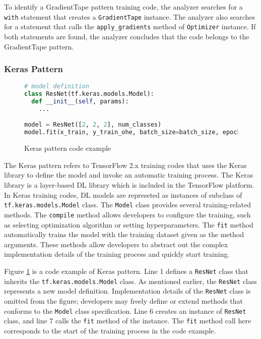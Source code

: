 To identify a GradientTape pattern training code,
the analyzer searches for a {\tt with} statement that creates a
{\tt GradientTape} instance.
The analyzer also searches for a statement that calls the {\tt apply\_gradients}
method of {\tt Optimizer} instance.
If both statements are found, the analyzer concludes that the code
belongs to the GradientTape pattern.

\subsubsection{Keras Pattern}

\begin{figure}[ht!]
  \begin{lstlisting}[language=Python]
# model definition
class ResNet(tf.keras.models.Model):
  def __init__(self, params):
    ...

model = ResNet([2, 2, 2], num_classes)
model.fit(x_train, y_train_ohe, batch_size=batch_size, epochs=epochs,
  \end{lstlisting}
 
  \caption{Keras pattern code example}
  \label{fig:keraspattern}
\end{figure}

The Keras pattern refers to TensorFlow 2.x training codes that uses
the Keras library to define the model and invoke an automatic
training process.
The Keras library\cite{keras} is a layer-based DL library which is
included in the TensorFlow platform.
In Keras training codes, DL models are represeted as instances of
subclass of {\tt tf.keras.models.Model} class.
The {\tt Model} class provides several training-related methods.
The {\tt compile} method allows developers to configure the training,
such as selecting optimization algorithm or setting hyperparameters.
The {\tt fit} method automatically trains the model with
the training dataset given as the method arguments.
These methods allow developers to abstract out the complex implementation
details of the training process and quickly start training.

Figure \ref{fig:keraspattern} is a code example of Keras pattern.
Line 1 defines a {\tt ResNet} class that inherits the 
{\tt tf.keras.models.Model} class. As mentioned earlier, the {\tt ResNet}
class represents a new model definition.
Implementation details of the {\tt ResNet} class is omitted from the 
figure; developers may freely define or extend methods that conforms to the
{\tt Model} class specification.
Line 6 creates an instance of {\tt ResNet} class, and line 7
calls the {\tt fit} method of the instance. 
The {\tt fit} method call here corresponds to the start of the training process
in the code example.


